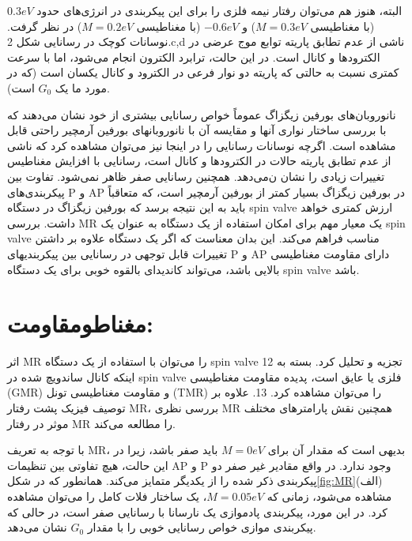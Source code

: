 البته، هنوز هم ‌‌می‌‌توان رفتار نیمه فلزی را برای این پیکربندی در انرژی‌های حدود $0.3 eV$ (با مغناطیسی $M = 0.3 eV$) و $-0.6 eV$ (با مغناطیسی $M = 0.2 eV$) در نظر گرفت. نوسانات کوچک در رسانایی شکل 2.c,d ناشی از عدم تطابق پاریته توابع موج عرضی در الکترودها و کانال است. در این حالت، ترابرد الکترون انجام ‌می‌شود، اما با سرعت کمتری نسبت به حالتی که پاریته دو نوار فرعی در الکترود و کانال یکسان است (که در مورد ما یک $G_0$ است).

نانوروبان‌های ‌بورفین زیگزاگ عموماً خواص رسانایی بیشتری از خود نشان ‌می‌دهند که با بررسی ساختار نواری آنها و مقایسه آن با نانوروبانهای ‌بورفین آرمچیر راحتی قابل مشاهده است. اگرچه نوسانات رسانایی را در اینجا نیز ‌‌می‌‌توان مشاهده کرد که ناشی از عدم تطابق پاریته حالات در الکترودها و کانال است، رسانایی با افزایش مغناطیس تغییرات زیادی را نشان ن‌‌می‌‌دهد. همچنین رسانایی صفر ظاهر نمی‌‌شود. تفاوت بین پیکربندی‌های \gls{P} و \gls{AP} در ‌بورفین زیگزاگ بسیار کمتر از ‌بورفین آرمچیر است، که متعاقباً باید به این نتیجه برسد که ‌بورفین زیگزاگ در دستگاه \gls{spin valve} ارزش کمتری خواهد داشت. بررسی \gls{MR} یک معیار مهم برای امکان استفاده از یک دستگاه به عنوان یک \gls{spin valve} مناسب فراهم ‌‌می‌‌کند. این بدان معناست که اگر یک دستگاه علاوه بر داشتن تغییرات قابل توجهی در رسانایی بین پیکربندیهای \gls{P} و \gls{AP} دارای مقاومت مغناطیسی بالایی باشد، ‌می‌تواند کاندیدای بالقوه خوبی برای یک دستگاه \gls{spin valve} باشد.

\section{مغناطومقاومت:}
اثر \gls{MR} را ‌‌می‌‌توان با استفاده از یک دستگاه \gls{spin valve} 12 تجزیه و تحلیل کرد. بسته به اینکه کانال ساندویچ شده در \gls{spin valve} فلزی یا عایق است، پدیده مقاومت مغناطیسی (\gls{GMR}) و مقاومت مغناطیسی تونل (\gls{TMR}) را ‌‌می‌‌توان مشاهده کرد. 13. علاوه بر توصیف فیزیک پشت رفتار \gls{MR}، بررسی نظری \gls{MR} همچنین نقش پارامترهای مختلف موثر در رفتار \gls{MR} \cite{harikumarNonEquilibriumGreenFunction2020} را مطالعه ‌می‌کند.

با توجه به تعریف \gls{MR}، بدیهی است که مقدار آن برای $M = 0 eV$ باید صفر باشد، زیرا در این حالت، هیچ تفاوتی بین تنظیمات \gls{AP} و \gls{P} وجود ندارد. در واقع مقادیر غیر صفر  دو پیکربندی ذکر شده را از یکدیگر متمایز ‌‌می‌‌کند. همانطور که در شکل\ref{fig:MR}(الف) مشاهده ‌‌می‌‌شود، زمانی که $M = 0.05 eV$، یک ساختار فلات کامل را ‌‌می‌‌توان مشاهده کرد. در این مورد، پیکربندی پادموازی یک نارسانا با رسانایی صفر است، در حالی که پیکربندی موازی خواص رسانایی خوبی را با مقدار $G_0$ نشان ‌می‌دهد. 

